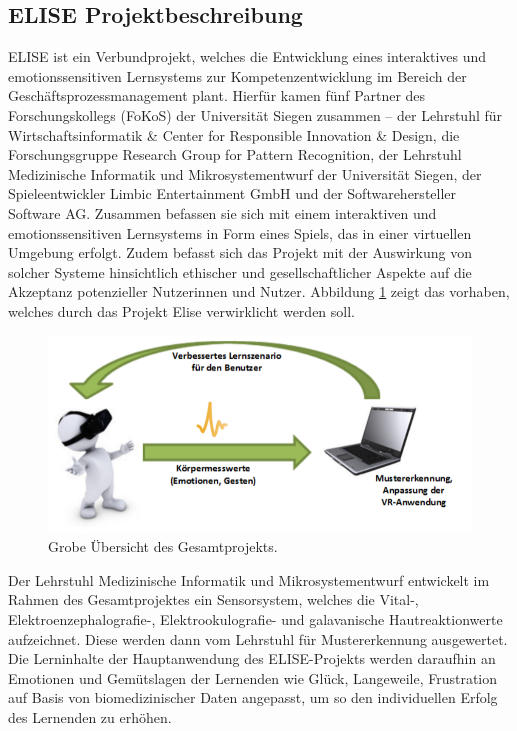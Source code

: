\subsection{ELISE Projektbeschreibung} \label{elise-subsec}


ELISE ist ein Verbundprojekt, welches die Entwicklung eines interaktives und emotionssensitiven Lernsystems zur Kompetenzentwicklung im Bereich der Gesch{\"a}ftsprozessmanagement plant. 
Hierf{\"u}r kamen f{\"u}nf Partner des Forschungskollegs (FoKoS) der Universit{\"a}t Siegen zusammen – der Lehrstuhl f{\"u}r Wirtschaftsinformatik \& Center for Responsible Innovation \& Design, die Forschungsgruppe Research Group for Pattern Recognition, der Lehrstuhl Medizinische Informatik und Mikrosystementwurf der Universit{\"a}t Siegen, der Spieleentwickler Limbic Entertainment GmbH und der Softwarehersteller Software AG. 
Zusammen befassen sie sich mit einem interaktiven und emotionssensitiven Lernsystems in Form eines Spiels, das in einer virtuellen Umgebung erfolgt. 
Zudem befasst sich das Projekt mit der Auswirkung von solcher Systeme hinsichtlich ethischer und gesellschaftlicher Aspekte auf die Akzeptanz potenzieller Nutzerinnen und Nutzer.
Abbildung \ref{fig-elise} zeigt das vorhaben, welches durch das Projekt Elise verwirklicht werden soll.


\begin{figure}[H] \centering
\includegraphics[width=12cm]{Images/elise_projektbeschreibung.png} 
\vspace{-0.3cm} 
\caption{Grobe {\"U}bersicht des Gesamtprojekts\cite{msckroenert}.}
\label{fig-elise} 
\end{figure}

Der Lehrstuhl Medizinische Informatik und Mikrosystementwurf entwickelt im Rahmen des Gesamtprojektes ein Sensorsystem, welches die Vital-, Elektroenzephalografie-, Elektrookulografie- und galavanische Hautreaktionwerte aufzeichnet. 
Diese werden dann vom Lehrstuhl f{\"u}r Mustererkennung ausgewertet. 
Die Lerninhalte der Hauptanwendung des ELISE-Projekts werden daraufhin an Emotionen und Gem{\"u}tslagen der Lernenden wie Gl{\"u}ck, Langeweile, Frustration auf Basis von biomedizinischer Daten angepasst, um so den individuellen Erfolg des Lernenden zu erh{\"o}hen.